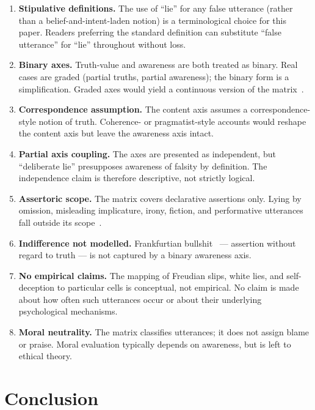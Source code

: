 \documentclass[11pt,a4paper]{article}
\begin{document}
\begin{enumerate}
  \item \textbf{Stipulative definitions.} The use of ``lie'' for any
        false utterance (rather than a belief-and-intent-laden notion)
        is a terminological choice for this paper. Readers preferring
        the standard definition can substitute ``false utterance'' for
        ``lie'' throughout without loss.
  \item \textbf{Binary axes.} Truth-value and awareness are both
        treated as binary. Real cases are graded (partial truths,
        partial awareness); the binary form is a simplification.
        Graded axes would yield a continuous version of the
        matrix~\cite{block1995}.
  \item \textbf{Correspondence assumption.} The content axis assumes a
        correspondence-style notion of truth. Coherence- or
        pragmatist-style accounts would reshape the content axis but
        leave the awareness axis intact.
  \item \textbf{Partial axis coupling.} The axes are presented as
        independent, but ``deliberate lie'' presupposes awareness of
        falsity by definition. The independence claim is therefore
        descriptive, not strictly logical.
  \item \textbf{Assertoric scope.} The matrix covers declarative
        assertions only. Lying by omission, misleading implicature,
        irony, fiction, and performative utterances fall outside its
        scope~\cite{saul2012,grice1975}.
  \item \textbf{Indifference not modelled.} Frankfurtian
        bullshit~\cite{frankfurt2005} --- assertion without regard to
        truth --- is not captured by a binary awareness axis.
  \item \textbf{No empirical claims.} The mapping of Freudian slips,
        white lies, and self-deception to particular cells is
        conceptual, not empirical. No claim is made about how often
        such utterances occur or about their underlying psychological
        mechanisms.
  \item \textbf{Moral neutrality.} The matrix classifies utterances;
        it does not assign blame or praise. Moral evaluation typically
        depends on awareness, but is left to ethical theory.
\end{enumerate}

\section{Conclusion}
\end{document}

